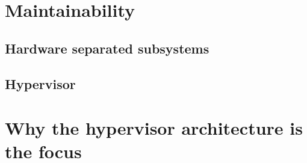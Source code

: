 
\section{Maintainability}
\subsection{Hardware separated subsystems}
\subsection{Hypervisor}


\section{Why the hypervisor architecture is the focus}